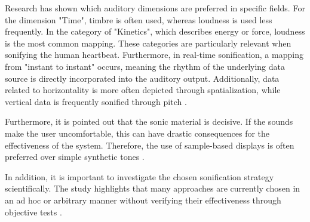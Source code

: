 Research has shown which auditory dimensions are preferred in specific fields. For the dimension "Time", timbre is often used, whereas loudness is used less frequently. In the category of "Kinetics", which describes energy or force, loudness is the most common mapping. These categories are particularly relevant when sonifying the human heartbeat. Furthermore, in real-time sonification, a mapping from "instant to instant" occurs, meaning the rhythm of the underlying data source is directly incorporated into the auditory output. Additionally, data related to horizontality is more often depicted through spatialization, while vertical data is frequently sonified through pitch \cite{dubus2013systematic}.

Furthermore, it is pointed out that the sonic material is decisive. If the sounds make the user uncomfortable, this can have drastic consequences for the effectiveness of the system. Therefore, the use of sample-based displays is often preferred over simple synthetic tones \cite{dubus2013systematic}.

In addition, it is important to investigate the chosen sonification strategy scientifically. The study highlights that many approaches are currently chosen in an ad hoc or arbitrary manner without verifying their effectiveness through objective tests \cite{dubus2013systematic}.








